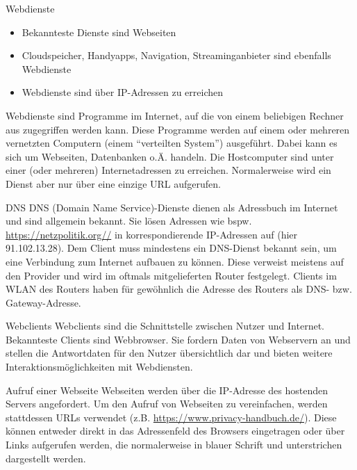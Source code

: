 \documentclass[utf8]{beamer}
\begin{document}
	\begin{frame}{Webdienste}
		\begin{itemize}
			\item Bekannteste Dienste sind Webseiten
			\item Cloudspeicher, Handyapps, Navigation, Streaminganbieter sind ebenfalls Webdienste
			\item Webdienste sind über IP-Adressen zu erreichen
		\end{itemize}
		Webdienste sind Programme im Internet, auf die von einem beliebigen Rechner aus zugegriffen werden kann. Diese Programme werden auf einem oder mehreren vernetzten Computern (einem \enquote{verteilten System}) ausgeführt. Dabei kann es sich um Webseiten, Datenbanken o.Ä. handeln. Die Hostcomputer sind unter einer (oder mehreren) Internetadressen zu erreichen. Normalerweise wird ein Dienst aber nur über eine einzige URL aufgerufen.
	\end{frame}
	
	\begin{frame}{DNS}
		DNS (Domain Name Service)-Dienste dienen als Adressbuch im Internet und sind allgemein bekannt. Sie lösen Adressen wie bspw. \url{https://netzpolitik.org//} in korrespondierende IP-Adressen auf (hier 91.102.13.28). Dem Client muss mindestens ein DNS-Dienst bekannt sein, um eine Verbindung zum Internet aufbauen zu können. Diese verweist meistens auf den Provider und wird im oftmals mitgelieferten Router festgelegt. Clients im WLAN des Routers haben für gewöhnlich die Adresse des Routers als DNS- bzw. Gateway-Adresse.
	\end{frame}
	
	\begin{frame}{Webclients}
		Webclients sind die Schnittstelle zwischen Nutzer und Internet. Bekannteste Clients sind Webbrowser. Sie fordern Daten von Webservern an und stellen die Antwortdaten für den Nutzer übersichtlich dar und bieten weitere Interaktionsmöglichkeiten mit Webdiensten.
	\end{frame}
	
	\begin{frame}{Aufruf einer Webseite}
		Webseiten werden über die IP-Adresse des hostenden Servers angefordert. Um den Aufruf von Webseiten zu vereinfachen, werden stattdessen URLs verwendet (z.B. \url{https://www.privacy-handbuch.de/}). Diese können entweder direkt in das Adressenfeld des Browsers eingetragen oder über Links aufgerufen werden, die normalerweise in blauer Schrift und unterstrichen dargestellt werden.
	\end{frame}
\end{document}
